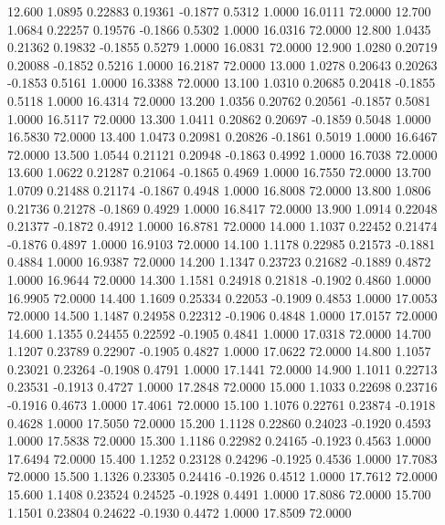   12.600   1.0895   0.22883   0.19361  -0.1877   0.5312   1.0000  16.0111  72.0000
  12.700   1.0684   0.22257   0.19576  -0.1866   0.5302   1.0000  16.0316  72.0000
  12.800   1.0435   0.21362   0.19832  -0.1855   0.5279   1.0000  16.0831  72.0000
  12.900   1.0280   0.20719   0.20088  -0.1852   0.5216   1.0000  16.2187  72.0000
  13.000   1.0278   0.20643   0.20263  -0.1853   0.5161   1.0000  16.3388  72.0000
  13.100   1.0310   0.20685   0.20418  -0.1855   0.5118   1.0000  16.4314  72.0000
  13.200   1.0356   0.20762   0.20561  -0.1857   0.5081   1.0000  16.5117  72.0000
  13.300   1.0411   0.20862   0.20697  -0.1859   0.5048   1.0000  16.5830  72.0000
  13.400   1.0473   0.20981   0.20826  -0.1861   0.5019   1.0000  16.6467  72.0000
  13.500   1.0544   0.21121   0.20948  -0.1863   0.4992   1.0000  16.7038  72.0000
  13.600   1.0622   0.21287   0.21064  -0.1865   0.4969   1.0000  16.7550  72.0000
  13.700   1.0709   0.21488   0.21174  -0.1867   0.4948   1.0000  16.8008  72.0000
  13.800   1.0806   0.21736   0.21278  -0.1869   0.4929   1.0000  16.8417  72.0000
  13.900   1.0914   0.22048   0.21377  -0.1872   0.4912   1.0000  16.8781  72.0000
  14.000   1.1037   0.22452   0.21474  -0.1876   0.4897   1.0000  16.9103  72.0000
  14.100   1.1178   0.22985   0.21573  -0.1881   0.4884   1.0000  16.9387  72.0000
  14.200   1.1347   0.23723   0.21682  -0.1889   0.4872   1.0000  16.9644  72.0000
  14.300   1.1581   0.24918   0.21818  -0.1902   0.4860   1.0000  16.9905  72.0000
  14.400   1.1609   0.25334   0.22053  -0.1909   0.4853   1.0000  17.0053  72.0000
  14.500   1.1487   0.24958   0.22312  -0.1906   0.4848   1.0000  17.0157  72.0000
  14.600   1.1355   0.24455   0.22592  -0.1905   0.4841   1.0000  17.0318  72.0000
  14.700   1.1207   0.23789   0.22907  -0.1905   0.4827   1.0000  17.0622  72.0000
  14.800   1.1057   0.23021   0.23264  -0.1908   0.4791   1.0000  17.1441  72.0000
  14.900   1.1011   0.22713   0.23531  -0.1913   0.4727   1.0000  17.2848  72.0000
  15.000   1.1033   0.22698   0.23716  -0.1916   0.4673   1.0000  17.4061  72.0000
  15.100   1.1076   0.22761   0.23874  -0.1918   0.4628   1.0000  17.5050  72.0000
  15.200   1.1128   0.22860   0.24023  -0.1920   0.4593   1.0000  17.5838  72.0000
  15.300   1.1186   0.22982   0.24165  -0.1923   0.4563   1.0000  17.6494  72.0000
  15.400   1.1252   0.23128   0.24296  -0.1925   0.4536   1.0000  17.7083  72.0000
  15.500   1.1326   0.23305   0.24416  -0.1926   0.4512   1.0000  17.7612  72.0000
  15.600   1.1408   0.23524   0.24525  -0.1928   0.4491   1.0000  17.8086  72.0000
  15.700   1.1501   0.23804   0.24622  -0.1930   0.4472   1.0000  17.8509  72.0000
